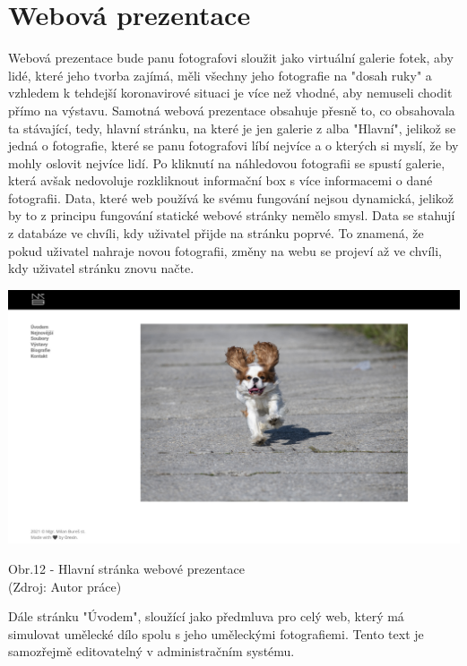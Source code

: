 \documentclass[12pt,a4paper]{report}
\begin{document}
  \chapter{Webová prezentace}
  Webová prezentace bude panu fotografovi sloužit jako virtuální galerie fotek, aby lidé, které jeho
  tvorba zajímá, měli všechny jeho fotografie na "dosah ruky" a vzhledem k tehdejší koronavirové
  situaci je více než vhodné, aby nemuseli chodit přímo na výstavu.
  Samotná webová prezentace obsahuje přesně to, co obsahovala ta stávající, tedy, hlavní stránku,
  na které je jen galerie z alba "Hlavní", jelikož se jedná o fotografie, které se panu fotografovi líbí
  nejvíce a o kterých si myslí, že by mohly oslovit nejvíce lidí. Po kliknutí na náhledovou fotografii se
  spustí galerie, která avšak nedovoluje rozkliknout informační box s více informacemi o dané
  fotografii.
  Data, které web používá ke svému fungování nejsou dynamická, jelikož by to z principu fungování
  statické webové stránky nemělo smysl. Data se stahují z databáze ve chvíli, kdy uživatel přijde na
  stránku poprvé. To znamená, že pokud uživatel nahraje novou fotografii, změny na webu se
  projeví až ve chvíli, kdy uživatel stránku znovu načte.

  \vspace*{0.5cm}
  \noindent\includegraphics[width=\linewidth]{dmp-bures.png}
  \begin{center}
    Obr.12 -  Hlavní stránka webové prezentace \\
    (Zdroj: Autor práce)
  \end{center}
  \vspace*{0.5cm}

  Dále stránku "Úvodem", sloužící jako předmluva pro celý web, který má simulovat umělecké
  dílo spolu s jeho uměleckými fotografiemi. Tento text je samozřejmě editovatelný v
  administračním systému.
  
\end{document}
